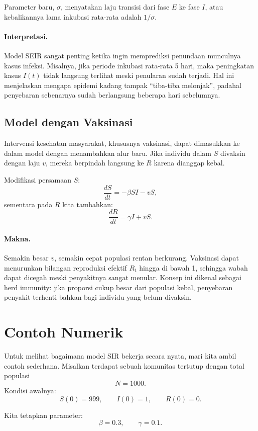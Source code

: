 \documentclass{bukumjh}
\begin{document}
Parameter baru, $\sigma$, menyatakan laju transisi dari fase $E$ ke fase $I$, atau kebalikannya lama inkubasi rata-rata adalah $1/\sigma$.

\paragraph{Interpretasi.}  
Model SEIR sangat penting ketika ingin memprediksi penundaan munculnya kasus infeksi. Misalnya, jika periode inkubasi rata-rata 5 hari, maka peningkatan kasus $I(t)$ tidak langsung terlihat meski penularan sudah terjadi. Hal ini menjelaskan mengapa epidemi kadang tampak “tiba-tiba melonjak”, padahal penyebaran sebenarnya sudah berlangsung beberapa hari sebelumnya.

\subsection{Model dengan Vaksinasi}

Intervensi kesehatan masyarakat, khususnya vaksinasi, dapat dimasukkan ke dalam model dengan menambahkan alur baru. Jika individu dalam $S$ divaksin dengan laju $v$, mereka berpindah langsung ke $R$ karena dianggap kebal.

Modifikasi persamaan $S$:
\[
\frac{dS}{dt} = -\beta S I - vS,
\]
sementara pada $R$ kita tambahkan:
\[
\frac{dR}{dt} = \gamma I + vS.
\]

\paragraph{Makna.}  
Semakin besar $v$, semakin cepat populasi rentan berkurang. Vaksinasi dapat menurunkan bilangan reproduksi efektif $R_t$ hingga di bawah 1, sehingga wabah dapat dicegah meski penyakitnya sangat menular. Konsep ini dikenal sebagai {\jsg herd immunity}: jika proporsi cukup besar dari populasi kebal, penyebaran penyakit terhenti bahkan bagi individu yang belum divaksin.

\section{Contoh Numerik}

Untuk melihat bagaimana model SIR bekerja secara nyata, mari kita ambil contoh sederhana. Misalkan terdapat sebuah komunitas tertutup dengan total populasi
\[
N = 1000.
\]
Kondisi awalnya:
\[
S(0) = 999, \qquad I(0) = 1, \qquad R(0) = 0.
\]

Kita tetapkan parameter:
\[
\beta = 0.3, \qquad \gamma = 0.1.
\]
\end{document}
